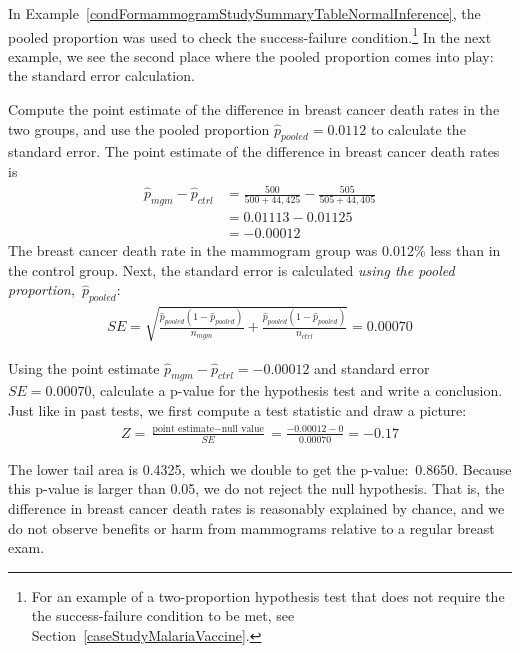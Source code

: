 In Example~\ref{condFormammogramStudySummaryTableNormalInference},
the pooled proportion was used to check the success-failure
condition.\footnote{For an example of a two-proportion
  hypothesis test that does not require the the
  success-failure condition to be met, see
  Section~\ref{caseStudyMalariaVaccine}.}
In the next example, we see the second place where the pooled
proportion comes into play: the standard error calculation.

\D{\newpage}

\begin{examplewrap}
\begin{nexample}{Compute the point estimate of the difference
    in breast cancer death rates in the two groups,
    and use the pooled proportion
    $\hat{p}_{\textit{pooled}} = 0.0112$ to calculate
    the standard error.}
  The point estimate of the difference in breast cancer death
  rates is
  \begin{align*}
  \hat{p}_{mgm} - \hat{p}_{ctrl}
    &= \frac{500}{500 + 44,425} - \frac{505}{505 + 44,405} \\
    &= 0.01113 - 0.01125 \\
    &= -0.00012
  \end{align*}
  The breast cancer death rate in the mammogram group
  was 0.012\% less than in the control group.
  Next, the standard error is calculated
  \emph{using the pooled proportion},~$\hat{p}_{\textit{pooled}}$:
\begin{align*}
SE = \sqrt{
      \frac{\hat{p}_{\textit{pooled}}(1-\hat{p}_{\textit{pooled}})}
          {n_{mgm}}
      + \frac{\hat{p}_{\textit{pooled}}(1-\hat{p}_{\textit{pooled}})}
          {n_{ctrl}}
    }
	= 0.00070
\end{align*}
\end{nexample}
\end{examplewrap}

\begin{examplewrap}
\begin{nexample}{Using the point estimate $\hat{p}_{mgm} - \hat{p}_{ctrl} = -0.00012$ and standard error $SE = 0.00070$, calculate a p-value for the hypothesis test and write a conclusion.}
Just like in past tests, we first compute a test statistic and draw a picture:
\begin{align*}
Z = \frac{\text{point estimate} - \text{null value}}{SE}
	= \frac{-0.00012 - 0}{0.00070}
	= -0.17
\end{align*}
\begin{center}
\end{center}
The lower tail area is 0.4325, which we double to get the p-value:~0.8650. Because this p-value is larger than 0.05, we do not reject the null hypothesis. That is, the difference in breast cancer death rates is reasonably explained by chance, and we do not observe benefits or harm from mammograms relative to a regular breast exam.
\end{nexample}
\end{examplewrap}


